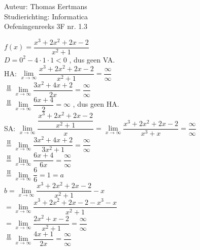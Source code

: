 \documentclass[a4paper]{article}
\begin{document}
  
\noindent \large Auteur: Thomas Eertmans \\
\noindent \large Studierichting: Informatica\\
\noindent \large Oefeningenreeks 3F nr. 1.3\\

\medskip

\normalsize

$f(x) = \dfrac{x^3+2x^2+2x-2}{x^2+1}$ \\

$D = 0^2 - 4 \cdot 1 \cdot 1 < 0$ , dus geen VA. \\

HA: $\lim\limits_{x\rightarrow\infty} \dfrac{x^3+2x^2+2x-2}{x^2+1} = \dfrac{\infty}{\infty}$ \\

$\overset{\mathrm{H}}{=} \lim\limits_{x\rightarrow\infty} \dfrac{3x^2+4x+2}{2x} = \dfrac{\infty}{\infty}$ \\

$\overset{\mathrm{H}}{=} \lim\limits_{x\rightarrow\infty} \dfrac{6x+4}{2} = \infty$ , dus geen HA. \\

SA: $\lim\limits_{x\rightarrow\infty} \dfrac{\dfrac{x^3+2x^2+2x-2}{x^2+1}}{x} = \lim\limits_{x\rightarrow\infty} \dfrac{x^3+2x^2+2x-2}{x^3+x} = \dfrac{\infty}{\infty}$ \\

$\overset{\mathrm{H}}{=} \lim\limits_{x\rightarrow\infty} \dfrac{3x^2+4x+2}{3x^2+1} = \dfrac{\infty}{\infty}$ \\

$\overset{\mathrm{H}}{=} \lim\limits_{x\rightarrow\infty} \dfrac{6x+4}{6x} = \dfrac{\infty}{\infty}$ \\

$\overset{\mathrm{H}}{=} \lim\limits_{x\rightarrow\infty} \dfrac{6}{6} = 1 = a$ \\

$b = \lim\limits_{x\rightarrow\infty} \dfrac{x^3+2x^2+2x-2}{x^2+1} - x$ \\

$= \lim\limits_{x\rightarrow\infty} \dfrac{x^3+2x^2+2x-2-x^3-x}{x^2+1}$ \\

$= \lim\limits_{x\rightarrow\infty} \dfrac{2x^2+x-2}{x^2+1} = \dfrac{\infty}{\infty}$ \\

$\overset{\mathrm{H}}{=} \lim\limits_{x\rightarrow\infty} \dfrac{4x+1}{2x} = \dfrac{\infty}{\infty}$ \\
\end{document}

